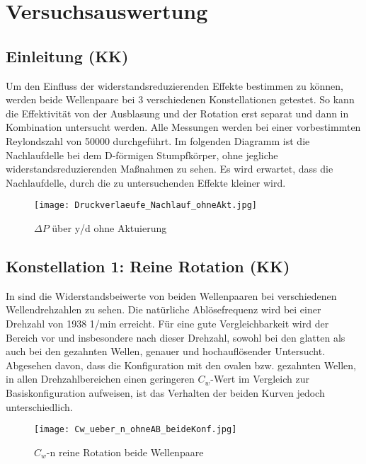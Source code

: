 \chapter{Versuchsauswertung}
\label{s:auswertung}
\section{Einleitung (KK)}
\label{s:einleitungAusw}
Um den Einfluss der widerstandsreduzierenden Effekte bestimmen zu k\"onnen, werden beide Wellenpaare bei 3  verschiedenen Konstellationen getestet. So kann die Effektivit\"at von der Ausblasung und der Rotation erst separat und dann in Kombination untersucht werden.
Alle Messungen werden bei einer vorbestimmten Reylondszahl von 50000 durchgef\"uhrt.
Im folgenden Diagramm ist die Nachlaufdelle bei dem D-f\"ormigen Stumpfk\"orper, ohne jegliche widerstandsreduzierenden Ma\ss{}nahmen zu sehen. 
Es wird erwartet, dass die Nachlaufdelle, durch die zu untersuchenden Effekte kleiner wird.
\begin{figure}[h]
	\centering
	\texttt{[image: Druckverlaeufe\_Nachlauf\_ohneAkt.jpg]}
	\caption{ $\Delta P$ \"uber y/d ohne Aktuierung }
	\label{fig:Deltap-y/d_ohne_Aktuation}
\end{figure}

\section{Konstellation 1: Reine Rotation (KK)}
\label{s:ReineRotation}

In   sind die Widerstandsbeiwerte von beiden Wellenpaaren bei verschiedenen Wellendrehzahlen zu sehen.
Die nat\"urliche Abl\"osefrequenz wird bei einer Drehzahl von 1938 1/min  erreicht. F\"ur eine gute Vergleichbarkeit wird der Bereich vor und insbesondere nach dieser Drehzahl, sowohl bei den glatten als auch bei den gezahnten Wellen, genauer und hochaufl\"osender Untersucht.
Abgesehen davon, dass die Konfiguration mit den ovalen bzw. gezahnten Wellen, in allen Drehzahlbereichen einen geringeren $C_{w}$-Wert im Vergleich zur Basiskonfiguration aufweisen, ist das Verhalten der beiden Kurven jedoch unterschiedlich.
\begin{figure}[h]
	\centering
	\texttt{[image: Cw\_ueber\_n\_ohneAB\_beideKonf.jpg]}
	\caption{ $C_{w}$-n reine Rotation beide Wellenpaare }
	\label{fig:Cw-n_Rein_Konf+2}
\end{figure}

